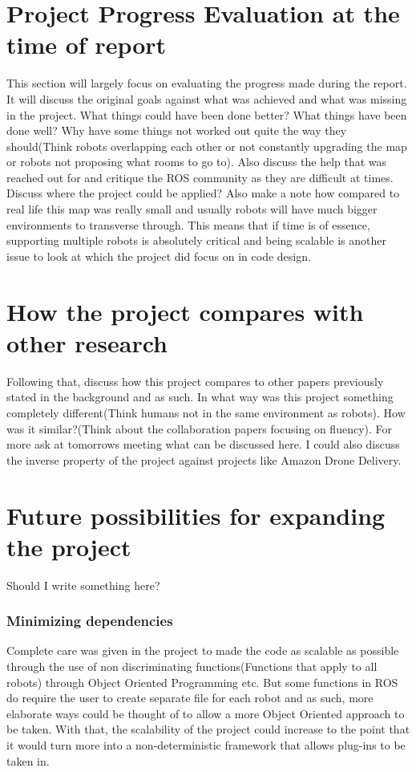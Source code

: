 \documentclass{report}
\begin{document}
    \section{Project Progress Evaluation at the time of report}
      This section will largely focus on evaluating the progress made during the report. It will discuss the original goals against what was achieved and what was missing in the project. What things could have been done better? What things have been done well? Why have some things not worked out quite the way they should(Think robots overlapping each other or not constantly upgrading the map or robots not proposing what rooms to go to). Also discuss the help that was reached out for and critique the ROS community as they are difficult at times. Discuss where the project could be applied? Also make a note how compared to real life this map was really small and usually robots will have much bigger environments to transverse through. This means that if time is of essence, supporting multiple robots is absolutely critical and being scalable is another issue to look at which the project did focus on in code design.

    \section{How the project compares with other research}
      Following that, discuss how this project compares to other papers previously stated in the background and as such. In what way was this project something completely different(Think humans not in the same environment as robots). How was it similar?(Think about the collaboration papers focusing on fluency). For more ask at tomorrows meeting what can be discussed here. I could also discuss the inverse property of the project against projects like Amazon Drone Delivery.

    \section{Future possibilities for expanding the project}
      Should I write something here?

      \subsubsection{Minimizing dependencies}
        Complete care was given in the project to made the code as scalable as possible through the use of non discriminating functions(Functions that apply to all robots) through Object Oriented Programming etc. But some functions in ROS do require the user to create separate file for each robot and as such, more elaborate ways could be thought of to allow a more Object Oriented approach to be taken. With that, the scalability of the project could increase to the point that it would turn more into a non-deterministic framework that allows plug-ins to be taken in.
\end{document}
